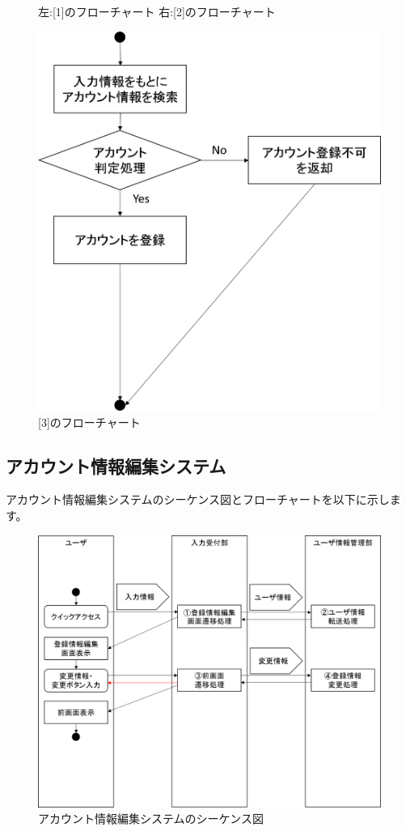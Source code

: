 \begin{figure}[htbp]
\begin{minipage}{0.5\hsize}
\begin{center}
  \end{center}
 \end{minipage}
 \caption{左:[1]のフローチャート 右:[2]のフローチャート}\label{fig:admincreateaccountflow0}
\end{figure}

\begin{figure}[htbp]
  \begin{center}
    \includegraphics[width=0.5\linewidth,clip]{./img/admin_create_account/sub3.png}
    \caption{[3]のフローチャート}\label{fig:admincreateaccountflow1}
  \end{center}
\end{figure}


\newpage
\subsection{アカウント情報編集システム}
アカウント情報編集システムのシーケンス図とフローチャートを以下に示します。

\begin{figure}[htbp]
  \begin{center}
    \includegraphics[width=1\linewidth,clip]{./img/edit_account/main.png}
    \caption{アカウント情報編集システムのシーケンス図}\label{fig:editaccountseaquence}
  \end{center}
\end{figure}

